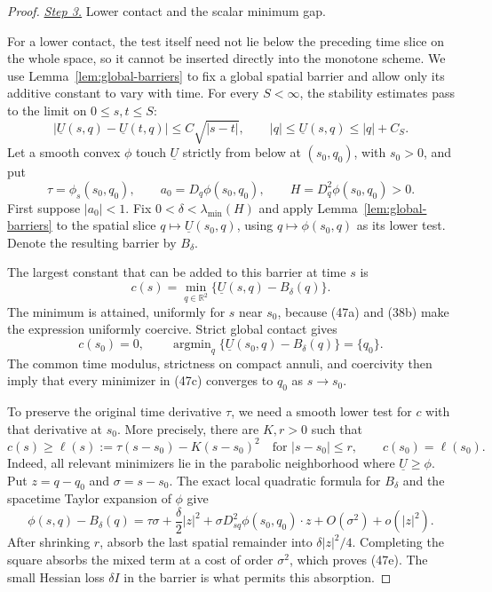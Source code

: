 \documentclass{smfart}
\theoremstyle{definition}
\newcommand{\1}{\mathbf 1}
\begin{document}
\begin{proof}
\smallskip\noindent
\underline{\textit{Step 3.}} Lower contact and the scalar minimum gap.

For a lower contact, the test itself need not lie below the preceding
time slice on the whole space, so it cannot be inserted directly into
the monotone scheme.  We use Lemma~\ref{lem:global-barriers} to fix
a global spatial barrier and allow only its additive constant to vary
with time.  For every $S<\infty$, the stability estimates pass to the
limit on $0\leq s,t\leq S$:
\begin{equation}
|\underline U(s,q)-\underline U(t,q)|
\leq C\sqrt{|s-t|},\qquad
|q|\leq\underline U(s,q)\leq|q|+C_ S.
\tag{47a}
\end{equation}
Let a smooth convex $\phi$ touch $\underline U$ strictly from
below at $(s_ 0,q_ 0)$, with $s_ 0>0$, and put
\begin{equation}
\tau=\phi_ s(s_ 0,q_ 0),\qquad
a_ 0=D_ q\phi(s_ 0,q_ 0),\qquad
H=D_ q^2\phi(s_ 0,q_ 0)>0.
\tag{47b}
\end{equation}
First suppose $|a_ 0|<1$.  Fix
$0<\delta<\lambda_ {\min}(H)$ and apply Lemma~\ref{lem:global-barriers} to the spatial slice
$q\mapsto\underline U(s_ 0,q)$, using
$q\mapsto\phi(s_ 0,q)$ as its lower test.  Denote the resulting
barrier by $B_ \delta$.

The largest constant that can be added to this barrier at time $s$ is
\begin{equation}
c(s)=\min_ {q\in\mathbb R^2}
\{\underline U(s,q)-B_ \delta(q)\}.
\tag{47c}
\end{equation}
The minimum is attained, uniformly for $s$ near $s_ 0$, because
(47a) and (38b) make the expression uniformly coercive.  Strict global
contact gives
\begin{equation}
c(s_ 0)=0,\qquad
\operatorname {argmin}_ q
\{\underline U(s_ 0,q)-B_ \delta(q)\}=\{q_ 0\}.
\tag{47d}
\end{equation}
The common time modulus, strictness on compact annuli, and coercivity
then imply that every minimizer in (47c) converges to $q_ 0$ as
$s\to s_ 0$.

To preserve the original time derivative $\tau$, we need a smooth
lower test for $c$ with that derivative at $s_0$.  More precisely,
there are $K,r>0$ such that
\begin{equation}
c(s)\geq\ell(s):=\tau(s-s_ 0)-K(s-s_ 0)^2
\quad\text{for }|s-s_ 0|\leq r,\qquad c(s_ 0)=\ell(s_ 0).
\tag{47e}
\end{equation}
Indeed, all relevant minimizers lie in the parabolic neighborhood
where $\underline U\geq\phi$.  Put $z=q-q_ 0$ and
$\sigma=s-s_ 0$.  The exact local quadratic formula for $B_ \delta$
and the spacetime Taylor expansion of $\phi$ give
\begin{equation}
\phi(s,q)-B_ \delta(q)
=\tau\sigma+\frac\delta2|z|^2
+\sigma D^2_ {sq}\phi(s_ 0,q_ 0)\cdot z
+O(\sigma^2)+o(|z|^2).
\tag{47f}
\end{equation}
After shrinking $r$, absorb the last spatial remainder into
$\delta|z|^2/4$.  Completing the square absorbs the mixed term at a
cost of order $\sigma^2$, which proves (47e).  The small Hessian loss
$\delta I$ in the barrier is what permits this absorption.


\end{proof}
\end{document}
